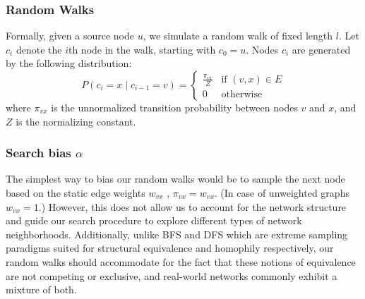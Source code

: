 \subsubsection{Random Walks}
Formally, given a source node $u$, we simulate a random walk of fixed length $l$. Let $c_i$ denote the $i${th} node in the walk, starting with $c_0 = u$. Nodes $c_i$ are generated by the following distribution:
%
\[
	P(c_i = x \mid c_{i-1} = v) =
	\begin{cases}
	\frac{\pi_{vx}}{Z} & \text{if } (v,x) \in E \\
	0 & \text{otherwise}
	\end{cases}
\]
%
where $\pi_{vx}$ is the unnormalized transition probability between nodes $v$ and $x$, and $Z$ is the normalizing constant. 

\subsubsection{Search bias \large{$\alpha$}}
The simplest way to bias our random walks would be to sample the next node based on the static edge weights $w_{vx}$ \ie, $\pi_{vx} = w_{vx}$. (In case of unweighted graphs $w_{vx}=1$.) However, this does not allow us to account for the network structure and guide our search procedure to explore different types of network neighborhoods. 
Additionally, unlike BFS and DFS which are extreme sampling paradigms suited for structural equivalence and homophily respectively, our random walks should accommodate for the fact that these notions of equivalence are not competing or exclusive, and real-world networks commonly exhibit a mixture of both. 


